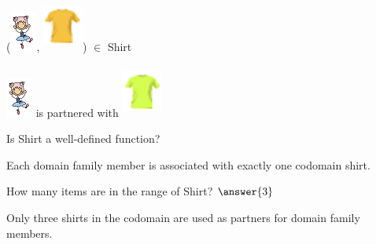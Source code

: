 \documentclass{ximera}
\begin{document}
\begin{exercise}

 ({\includegraphics[width=33px,height=49px]{pics/elements/family/family2.png}}, {\includegraphics[width=50px,height=65px]{pics/elements/shirts/shirts2.png}}) $\in$ Shirt 

  \begin{multipleChoice}
  \end{multipleChoice}
  \begin{feedback}
{\includegraphics[width=33px,height=49px]{pics/elements/family/family2.png}} is partnered with {\includegraphics[width=50px,height=65px]{pics/elements/shirts/shirts4.png}}
  \end{feedback}
\end{exercise}






\begin{exercise}
Is Shirt a well-defined function?
  \begin{multipleChoice}
  \end{multipleChoice}
  \begin{feedback}
Each domain family member is associated with exactly one codomain shirt.
  \end{feedback}
\end{exercise}





\begin{exercise}
How many items are in the range of Shirt? $\answer{3}$
  \begin{feedback}
Only three shirts in the codomain are used as partners for domain family members.
  \end{feedback}
\end{exercise}
\end{document}
